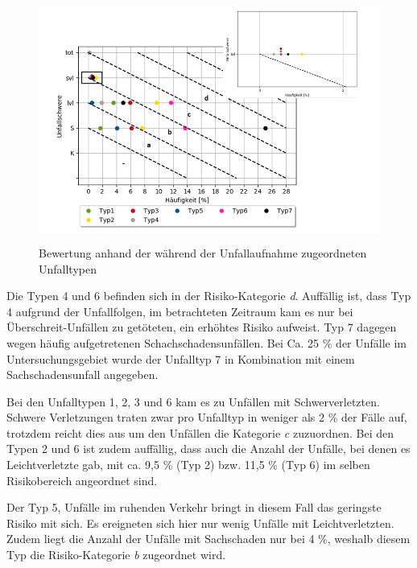 \begin{savenotes}
	\begin{figure}[H]
		\centering
		\includegraphics[width=12cm,height=8cm]{figures/Bewertung_UT}
		\caption[Bewertung anhand der während der Unfallaufnahme zugeordneten Unfalltypen]{Bewertung anhand der während der Unfallaufnahme zugeordneten Unfalltypen}\label{fig:Bewertung_UT}
	\end{figure}
\end{savenotes}

Die Typen 4 und 6 befinden sich in der Risiko-Kategorie \textit{d}. Auffällig ist, dass Typ 4 aufgrund der Unfallfolgen, im  betrachteten Zeitraum kam es nur bei Überschreit-Unfällen zu getöteten, ein erhöhtes Risiko aufweist. Typ 7 dagegen wegen häufig aufgetretenen Schachschadensunfällen. Bei Ca. 25 \% der Unfälle im Untersuchungsgebiet wurde der Unfalltyp 7 in Kombination mit einem Sachschadensunfall angegeben.

Bei den Unfalltypen 1, 2, 3 und 6 kam es zu Unfällen mit Schwerverletzten. Schwere Verletzungen traten zwar pro Unfalltyp in weniger als 2 \% der Fälle auf, trotzdem reicht dies aus um den Unfällen die Kategorie \textit{c} zuzuordnen. Bei den Typen 2 und 6 ist zudem auffällig, dass auch die Anzahl der Unfälle, bei denen es Leichtverletzte gab, mit ca. 9,5 \% (Typ 2) bzw. 11,5 \% (Typ 6) im selben Risikobereich angeordnet sind.

Der Typ 5, Unfälle im ruhenden Verkehr bringt in diesem Fall das geringste Risiko mit sich. Es ereigneten sich hier nur wenig Unfälle mit Leichtverletzten. Zudem liegt die Anzahl der Unfälle mit Sachschaden nur bei 4 \%, weshalb diesem Typ die Risiko-Kategorie \textit{b} zugeordnet wird.

